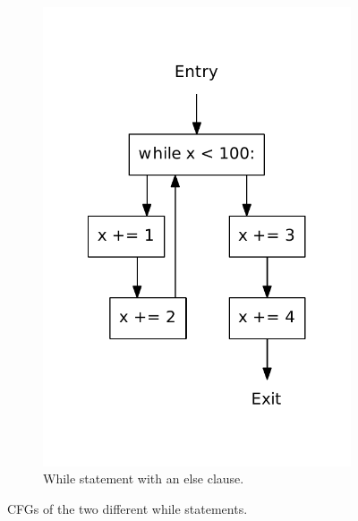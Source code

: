 \begin{figure}
\begin{subfigure}[b]{.4\textwidth}
    \includegraphics[scale=.5]{./figures/while_else.pdf}
    \caption{While statement with an else clause.}
    \label{fig:while:while_else}
  \end{subfigure}  
  \caption{CFGs of the two different while statements.}
  \label{fig:while}
\end{figure}
